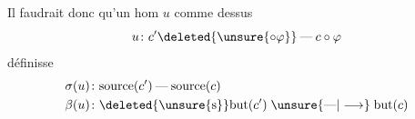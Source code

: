 Il faudrait donc qu'un hom $u$ comme dessus
\[ u\colon c'\deleted{\unsure{\circ\varphi}}\mathbin{\text{---}}c\circ\varphi \]
définisse
\[ \begin{aligned} \sigma(u)&\colon\mathrm{source}(c')\mathbin{\text{---}}\mathrm{source}(c)\\ \beta(u)&\colon\deleted{\unsure{\mathrm{s}}}\mathrm{but}(c')\mathrel{\unsure{\text{---}|\longrightarrow}}\mathrm{but}(c)\end{aligned} \]
